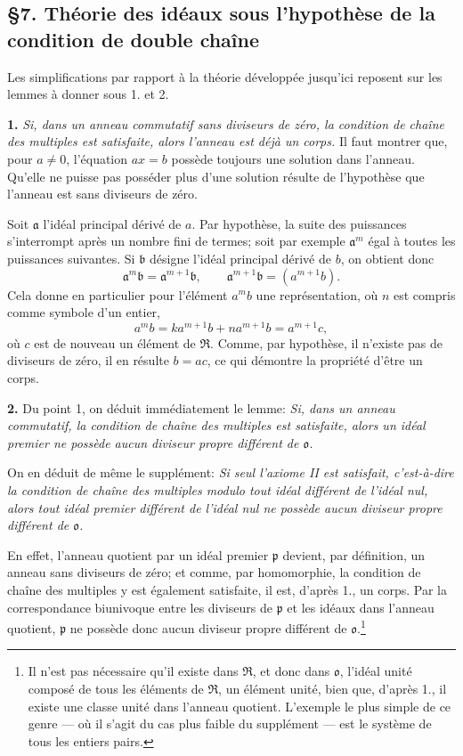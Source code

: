 \providecommand{\mR}{\mathfrak{R}}
\providecommand{\ma}{\mathfrak{a}}
\providecommand{\mb}{\mathfrak{b}}
\providecommand{\mm}{\mathfrak{m}}
\providecommand{\mo}{\mathfrak{o}}
\providecommand{\mpideal}{\mathfrak{p}}
\providecommand{\mq}{\mathfrak{q}}
\providecommand{\mbar}[1]{\overline{#1}}

\subsection*{\S{}7. Théorie des idéaux sous l'hypothèse de la condition de double chaîne}

Les simplifications par rapport à la théorie développée jusqu'ici reposent sur les lemmes à donner sous 1. et 2.

\textbf{1.} \emph{Si, dans un anneau commutatif sans diviseurs de zéro, la condition de chaîne des multiples est satisfaite, alors l'anneau est déjà un corps.} Il faut montrer que, pour $a\ne0$, l'équation $ax=b$ possède toujours une solution dans l'anneau. Qu'elle ne puisse pas posséder plus d'une solution résulte de l'hypothèse que l'anneau est sans diviseurs de zéro.

Soit $\ma$ l'idéal principal dérivé de $a$. Par hypothèse, la suite des puissances s'interrompt après un nombre fini de termes; soit par exemple $\ma^m$ égal à toutes les puissances suivantes. Si $\mb$ désigne l'idéal principal dérivé de $b$, on obtient donc
\[
\ma^m\mb=\ma^{m+1}\mb,
\qquad \ma^{m+1}\mb=(a^{m+1}b).
\]
Cela donne en particulier pour l'élément $a^m b$ une représentation, où $n$ est compris comme symbole d'un entier,
\[
 a^m b=k a^{m+1}b+n a^{m+1}b=a^{m+1}c,
\]
où $c$ est de nouveau un élément de $\mR$. Comme, par hypothèse, il n'existe pas de diviseurs de zéro, il en résulte $b=ac$, ce qui démontre la propriété d'être un corps.

\textbf{2.} Du point 1, on déduit immédiatement le lemme: \emph{Si, dans un anneau commutatif, la condition de chaîne des multiples est satisfaite, alors un idéal premier ne possède aucun diviseur propre différent de $\mo$.}

On en déduit de même le supplément: \emph{Si seul l'axiome II est satisfait, c'est-à-dire la condition de chaîne des multiples modulo tout idéal différent de l'idéal nul, alors tout idéal premier différent de l'idéal nul ne possède aucun diviseur propre différent de $\mo$.}

En effet, l'anneau quotient par un idéal premier $\mpideal$ devient, par définition, un anneau sans diviseurs de zéro; et comme, par homomorphie, la condition de chaîne des multiples y est également satisfaite, il est, d'après 1., un corps. Par la correspondance biunivoque entre les diviseurs de $\mpideal$ et les idéaux dans l'anneau quotient, $\mpideal$ ne possède donc aucun diviseur propre différent de $\mo$.\footnote{Il n'est pas nécessaire qu'il existe dans $\mR$, et donc dans $\mo$, l'idéal unité composé de tous les éléments de $\mR$, un élément unité, bien que, d'après 1., il existe une classe unité dans l'anneau quotient. L'exemple le plus simple de ce genre --- où il s'agit du cas plus faible du supplément --- est le système de tous les entiers pairs.}

